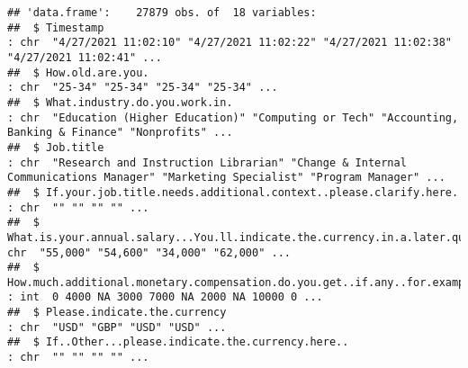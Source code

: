 \documentclass[
]{article}
\begin{document}
\begin{verbatim}
## 'data.frame':    27879 obs. of  18 variables:
##  $ Timestamp                                                                                                                                                                                                                           : chr  "4/27/2021 11:02:10" "4/27/2021 11:02:22" "4/27/2021 11:02:38" "4/27/2021 11:02:41" ...
##  $ How.old.are.you.                                                                                                                                                                                                                    : chr  "25-34" "25-34" "25-34" "25-34" ...
##  $ What.industry.do.you.work.in.                                                                                                                                                                                                       : chr  "Education (Higher Education)" "Computing or Tech" "Accounting, Banking & Finance" "Nonprofits" ...
##  $ Job.title                                                                                                                                                                                                                           : chr  "Research and Instruction Librarian" "Change & Internal Communications Manager" "Marketing Specialist" "Program Manager" ...
##  $ If.your.job.title.needs.additional.context..please.clarify.here.                                                                                                                                                                    : chr  "" "" "" "" ...
##  $ What.is.your.annual.salary...You.ll.indicate.the.currency.in.a.later.question..If.you.are.part.time.or.hourly..please.enter.an.annualized.equivalent....what.you.would.earn.if.you.worked.the.job.40.hours.a.week..52.weeks.a.year..: chr  "55,000" "54,600" "34,000" "62,000" ...
##  $ How.much.additional.monetary.compensation.do.you.get..if.any..for.example..bonuses.or.overtime.in.an.average.year...Please.only.include.monetary.compensation.here..not.the.value.of.benefits.                                      : int  0 4000 NA 3000 7000 NA 2000 NA 10000 0 ...
##  $ Please.indicate.the.currency                                                                                                                                                                                                        : chr  "USD" "GBP" "USD" "USD" ...
##  $ If..Other...please.indicate.the.currency.here..                                                                                                                                                                                     : chr  "" "" "" "" ...

\end{verbatim}
\end{document}
